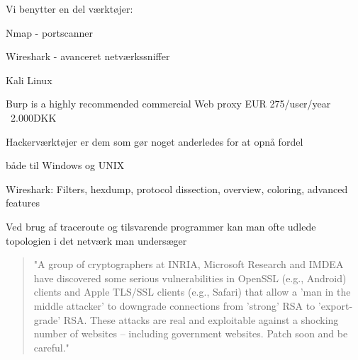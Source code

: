 \documentclass[20pt,landscape,a4paper]{foils}
\begin{document}
\begin{list1}
\item Vi benytter en del værktøjer:
\begin{list2}
\item Nmap -  portscanner
\item Wireshark -  avanceret netværkssniffer
\item Kali Linux 
\item Burp is a highly recommended commercial Web proxy EUR 275/user/year ~2.000DKK\\
\end{list2}

\end{list1}


Hackerværktøjer er dem som gør noget anderledes for at opnå fordel






\centerline{}
\centerline{både til Windows og UNIX}


Wireshark: Filters, hexdump, protocol dissection, overview, coloring, advanced features





\begin{list1}
\item Ved brug af traceroute og tilsvarende programmer kan man ofte
  udlede topologien i det netværk man undersæger
\end{list1}










\begin{quote}
"A group of cryptographers at INRIA, Microsoft Research and IMDEA have discovered some serious vulnerabilities in OpenSSL (e.g., Android) clients and Apple TLS/SSL clients (e.g., Safari) that allow a 'man in the middle attacker' to downgrade connections from 'strong' RSA to 'export-grade' RSA. These attacks are real and exploitable against a shocking number of websites -- including government websites. Patch soon and be careful."
\end{quote}
\end{document}
